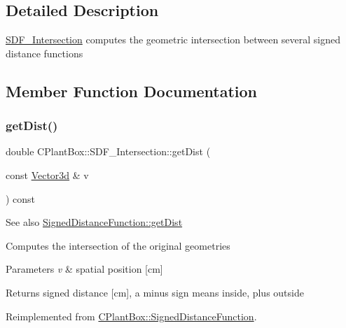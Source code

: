 \subsection{Detailed Description}
\hyperlink{classCPlantBox_1_1SDF__Intersection}{S\+D\+F\+\_\+\+Intersection} computes the geometric intersection between several signed distance functions 

\subsection{Member Function Documentation}
\mbox{\label{classCPlantBox_1_1SDF__Intersection_a2ed780db3881844484086de3f73543e5}} 
\subsubsection{\texorpdfstring{get\+Dist()}{getDist()}}
{\footnotesize\ttfamily double C\+Plant\+Box\+::\+S\+D\+F\+\_\+\+Intersection\+::get\+Dist (\begin{DoxyParamCaption}\item[{const \hyperlink{classCPlantBox_1_1Vector3d}{Vector3d} \&}]{v }\end{DoxyParamCaption}) const\hspace{0.3cm}{\ttfamily [virtual]}}

\begin{DoxySeeAlso}{See also}
\hyperlink{classCPlantBox_1_1SignedDistanceFunction_a8e58237574af3673906bba84d5d14ee8}{Signed\+Distance\+Function\+::get\+Dist}
\end{DoxySeeAlso}
Computes the intersection of the original geometries


\begin{DoxyParams}{Parameters}
{\em v} & spatial position \mbox{[}cm\mbox{]} \\
\hline
\end{DoxyParams}
\begin{DoxyReturn}{Returns}
signed distance \mbox{[}cm\mbox{]}, a minus sign means inside, plus outside 
\end{DoxyReturn}


Reimplemented from \hyperlink{classCPlantBox_1_1SignedDistanceFunction_a8e58237574af3673906bba84d5d14ee8}{C\+Plant\+Box\+::\+Signed\+Distance\+Function}.




